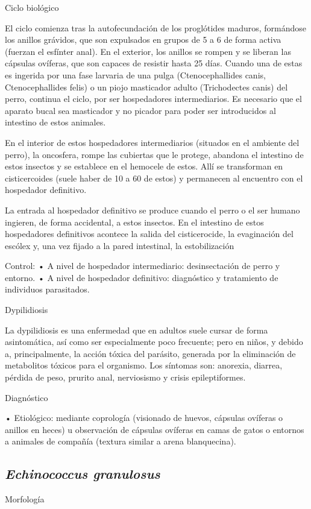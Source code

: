 Ciclo biológico

El ciclo comienza tras la autofecundación de los proglótides maduros, formándose los anillos grávidos, que son expulsados en grupos de 5 a 6 de forma activa (fuerzan el esfínter anal). En el exterior, los anillos se rompen y se liberan las cápsulas ovíferas, que son capaces de resistir hasta 25 días. Cuando una de estas es ingerida por una fase larvaria de una pulga (Ctenocephallides canis, Ctenocephallides felis) o un piojo masticador adulto (Trichodectes canis) del perro, continua el ciclo, por ser hospedadores intermediarios. Es necesario que el aparato bucal sea masticador y no picador para poder ser introducidos al intestino de estos animales.

En el interior de estos hospedadores intermediarios (situados en el ambiente del perro), la oncosfera, rompe las cubiertas que le protege, abandona el intestino de estos insectos y se establece en el hemocele de estos. Allí se transforman en cisticercoides (suele haber de 10 a 60 de estos) y permanecen al encuentro con el hospedador definitivo.

La entrada al hospedador definitivo se produce cuando el perro o el ser humano ingieren, de forma accidental, a estos insectos. En el intestino de estos hospedadores definitivos acontece la salida del cisticerocide, la evaginación del escólex y, una vez fijado a la pared intestinal, la estobilización 

Control:
• A nivel de hospedador intermediario: desinsectación de perro y entorno.
• A nivel de hospedador definitivo: diagnóstico y tratamiento de individuos parasitados.

Dypilidiosis

La dypilidiosis es una enfermedad que en adultos suele cursar de forma asintomática, así como ser especialmente poco frecuente; pero en niños, y debido a, principalmente, la acción tóxica del parásito, generada por la eliminación de metabolitos tóxicos para el organismo. Los síntomas son: anorexia, diarrea, pérdida de peso, prurito anal, nerviosismo y crisis epileptiformes.

Diagnóstico

• Etiológico: mediante coprología (visionado de huevos, cápsulas ovíferas o anillos en heces) u observación de cápsulas ovíferas en camas de gatos o entornos a animales de compañía (textura similar a arena blanquecina).
\newpage
\subsection{\textit{Echinococcus granulosus}}
Morfología

